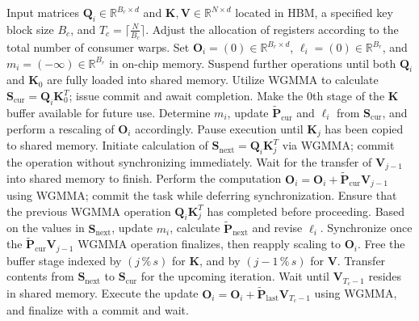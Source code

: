 \begin{enumerate}
\begin{algorithm}[H]
    \caption{\small\label{alg:flash3_wgmma}\textsc{FlashAttention-3} consumer warpgroup forward pass}
    \begin{algorithmic}[1]
      \REQUIRE  Input matrices $\mathbf{Q}_i \in \mathbb{R}^{B_r \times d}$ and $\mathbf{K}, \mathbf{V} \in \mathbb{R}^{N \times d}$ located in HBM, a specified key block size $B_c$, and $T_c = \lceil \frac{N}{B_c} \rceil$.
      \STATE Adjust the allocation of registers according to the total number of consumer warps.
      \STATE Set $\mathbf{O}_i = (0) \in \mathbb{R}^{B_r \times d}$, $\ell_i = (0) \in \mathbb{R}^{B_r}$, and $m_i = (-\infty) \in \mathbb{R}^{B_r}$ in on-chip memory.
      \STATE Suspend further operations until both $\mathbf{Q}_i$ and $\mathbf{K}_0$ are fully loaded into shared memory.
      \STATE Utilize WGMMA to calculate $\mathbf{S}_{\mathrm{cur}} = \mathbf{Q}_i \mathbf{K}_0^T$; issue commit and await completion.
      \STATE Make the $0$th stage of the $\mathbf{K}$ buffer available for future use.
      \STATE Determine $m_{i}$, update $\tilde{\mathbf{P}}_{\mathrm{cur}}$ and $\ell_{i}$ from $\mathbf{S}_{\mathrm{cur}}$, and perform a rescaling of $\mathbf{O}_i$ accordingly.
        \STATE Pause execution until $\mathbf{K}_j$ has been copied to shared memory.
        \label{code:mainloop_start}
        \STATE Initiate calculation of $\mathbf{S}_{\mathrm{next}} = \mathbf{Q}_i \mathbf{K}_{j}^T$ via WGMMA; commit the operation without synchronizing immediately. \label{code:first_wgmma}
        \STATE Wait for the transfer of $\mathbf{V}_{j-1}$ into shared memory to finish.
        \STATE Perform the computation $\mathbf{O}_{i} = \mathbf{O}_{i} + \tilde{\mathbf{P}}_{\mathrm{cur}} \mathbf{V}_{j-1}$ using WGMMA; commit the task while deferring synchronization. \label{code:second_wgmma}
        \STATE Ensure that the previous WGMMA operation $\mathbf{Q}_i \mathbf{K}_{j}^T$ has completed before proceeding.
        \STATE Based on the values in $\mathbf{S}_{\mathrm{next}}$, update $m_{i}$, calculate $\tilde{\mathbf{P}}_{\mathrm{next}}$ and revise $\ell_{i}$. \label{code:softmax}
        \STATE Synchronize once the $\tilde{\mathbf{P}}_{\mathrm{cur}} \mathbf{V}_{j-1}$ WGMMA operation finalizes, then reapply scaling to $\mathbf{O}_i$.
        \STATE Free the buffer stage indexed by $(j\,\%\,s)$ for $\mathbf{K}$, and by $(j-1\,\%\,s)$ for $\mathbf{V}$.
        \STATE Transfer contents from $\mathbf{S}_{\mathrm{next}}$ to $\mathbf{S}_{\mathrm{cur}}$ for the upcoming iteration.
        \label{code:mainloop_end}
      \ENDFOR \STATE Wait until $\mathbf{V}_{T_c - 1}$ resides in shared memory.
      \STATE Execute the update
      $\mathbf{O}_{i} = \mathbf{O}_{i} + \tilde{\mathbf{P}}_{\mathrm{last}} \mathbf{V}_{T_c - 1}$ using WGMMA, and finalize with a commit and wait.


\end{algorithmic}
\end{algorithm}
\end{enumerate}
